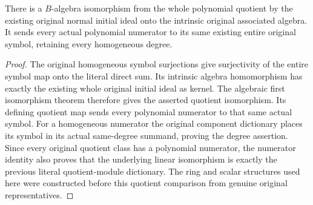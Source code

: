 \begin{theorem}
\label{hir:relative-normal-intrinsic-associated-quotient-algebra-dictionary}
\leanok
{}
There is a $B$-algebra isomorphism from the whole polynomial quotient by
the existing original normal initial ideal onto the intrinsic original
associated algebra. It sends every actual polynomial numerator to its
same existing entire original symbol, retaining every homogeneous degree.
\end{theorem}
\begin{proof}
The original homogeneous symbol surjections give surjectivity of the
entire symbol map onto the literal direct sum. Its intrinsic algebra
homomorphism has exactly the existing whole original initial ideal as
kernel. The algebraic first isomorphism theorem therefore gives the
asserted quotient isomorphism. Its defining quotient map sends every
polynomial numerator to that same actual symbol. For a homogeneous
numerator the original component dictionary places its symbol in its
actual same-degree summand, proving the degree assertion. Since every original quotient class has a polynomial numerator, the numerator identity also proves that the underlying linear isomorphism is exactly the previous literal quotient-module dictionary. The ring and
scalar structures used here were constructed before this quotient
comparison from genuine original representatives.
\end{proof}
